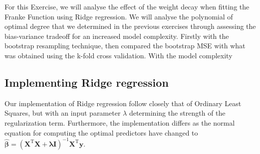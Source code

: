 \documentclass[11pt, a4paper]{article}
\begin{document}
For this Exercise, we will analyse the effect of the weight decay when fitting the Franke Function using Ridge regression. We will analyse the polynomial of optimal degree that we determined in the previous exercises through assessing the bias-variance tradeoff for an increased model complexity. Firstly with the bootstrap resampling technique, then compared the bootstrap MSE with what was obtained using the k-fold cross validation. With the model complexity  

\subsection*{Implementing Ridge regression}
Our implementation of Ridge regression follow closely that of Ordinary Least Squares, but with an input parameter $\lambda$ determining the strength of the regularization term. Furthermore, the implementation differs as the normal equation for computing the optimal predictors have changed to $\bm{\hat{\beta}} = \left(\bm{X}^\text{T}\bm{X} + \bm{\lambda}\bm{I}\right)^{-1}\bm{X}^\text{T}\bm{y}$. 
\end{document}
